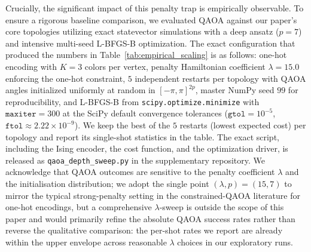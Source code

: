\documentclass{ieeeaccess}
\begin{document}
Crucially, the significant impact of this penalty trap is empirically observable. To ensure a rigorous baseline comparison, we evaluated QAOA against our paper's core topologies utilizing exact statevector simulations with a deep ansatz ($p = 7$) and intensive multi-seed L-BFGS-B optimization. The exact configuration that produced the numbers in Table~\ref{tab:empirical_scaling} is as follows: one-hot encoding with $K = 3$ colors per vertex, penalty Hamiltonian coefficient $\lambda = 15.0$ enforcing the one-hot constraint, $5$ independent restarts per topology with QAOA angles initialized uniformly at random in $[-\pi, \pi]^{2p}$, master NumPy seed $99$ for reproducibility, and L-BFGS-B from \texttt{scipy.optimize.minimize} with $\mathtt{maxiter}=300$ at the SciPy default convergence tolerances ($\mathtt{gtol}=10^{-5}$, $\mathtt{ftol}\approx 2.22 \times 10^{-9}$). We keep the best of the $5$ restarts (lowest expected cost) per topology and report its single-shot statistics in the table. The exact script, including the Ising encoder, the cost function, and the optimization driver, is released as \texttt{qaoa\_depth\_sweep.py} in the supplementary repository. We acknowledge that QAOA outcomes are sensitive to the penalty coefficient $\lambda$ and the initialisation distribution; we adopt the single point $(\lambda, p)=(15, 7)$ to mirror the typical strong-penalty setting in the constrained-QAOA literature for one-hot encodings, but a comprehensive $\lambda$-sweep is outside the scope of this paper and would primarily refine the absolute QAOA success rates rather than reverse the qualitative comparison: the per-shot rates we report are already within the upper envelope across reasonable $\lambda$ choices in our exploratory runs.
\end{document}
